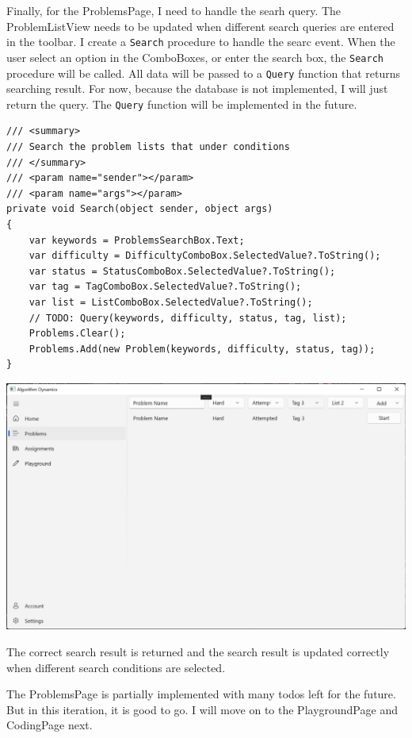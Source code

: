 \documentclass[a4paper]{report}
\begin{document}
Finally, for the ProblemsPage, I need to handle the searh query. The ProblemListView needs to be updated when different search queries are entered in the toolbar. I create a \texttt{Search} procedure to handle the searc event. When the user select an option in the ComboBoxes, or enter the search box, the \texttt{Search} procedure will be called. All data will be passed to a \texttt{Query} function that returns searching result. For now, because the database is not implemented, I will just return the query. The \texttt{Query} function will be implemented in the future.

\begin{verbatim}
/// <summary>
/// Search the problem lists that under conditions
/// </summary>
/// <param name="sender"></param>
/// <param name="args"></param>
private void Search(object sender, object args)
{
    var keywords = ProblemsSearchBox.Text;
    var difficulty = DifficultyComboBox.SelectedValue?.ToString();
    var status = StatusComboBox.SelectedValue?.ToString();
    var tag = TagComboBox.SelectedValue?.ToString();
    var list = ListComboBox.SelectedValue?.ToString();
    // TODO: Query(keywords, difficulty, status, tag, list);
    Problems.Clear();
    Problems.Add(new Problem(keywords, difficulty, status, tag));
}
\end{verbatim}

\includegraphics[width=\textwidth, height=\textheight, keepaspectratio]{ProblemsPage-Search}

The correct search result is returned and the search result is updated correctly when different search conditions are selected.

The ProblemsPage is partially implemented with many todos left for the future. But in this iteration, it is good to go. I will move on to the PlaygroundPage and CodingPage next.
\end{document}
